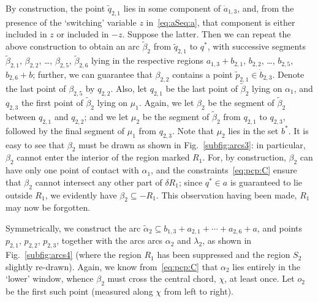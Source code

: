\documentclass{article}
\newcommand{\intermediate}[1]{\dot{#1}}
\begin{document}
By construction, the point $\tilde{q}_{2,1}$ lies in some component of
$\intermediate{a}_{1,3}$, and, from the presence of the `switching'
variable $z$ in~\eqref{eq:aSeq:a}, that component is either included
in $z$ or included in $-z$. Suppose the latter.  Then we can repeat
the above construction to obtain an arc $\tilde{\beta}_2$ from
$\tilde{q}_{2,1}$ to $q^*$, with successive segments
$\tilde{\beta}_{2,1}$, $\beta_{2,2}$, \ldots, $\beta_{2,5}$,
$\tilde{\beta}_{2,6}$ lying in the respective regions $a_{1,3} +
b_{2,1}$, $b_{2,2}$, \dots, $b_{2,5}$, $b_{2,6} + b$; further, we can
guarantee that $\beta_{2,2}$ contains a point $\tilde{p}_{2,1} \in
\intermediate{b}_{2,3}$.  Denote the last point of $\beta_{2,5}$ by
$q_{2,2}$. Also, let $q_{2,1}$ be the last point of $\tilde{\beta}_2$
lying on $\alpha_1$, and $q_{2,3}$ the first point of
$\tilde{\beta}_2$ lying on $\mu_1$.  Again, we let $\beta_2$ be the
segment of $\tilde{\beta}_2$ between $q_{2,1}$ and $q_{2,2}$; and we
let $\mu_2$ be the segment of $\tilde{\beta}_2$ from $q_{2,1}$ to
$q_{2,3}$, followed by the final segment of $\mu_1$ from $q_{2,3}$.
Note that $\mu_2$ lies in the set $b^*$. It is easy to see that $\beta_2$
must be drawn as shown in Fig.~\ref{subfig:arcs3}: in particular,
$\beta_2$ cannot enter the interior of the region marked $R_1$. For,
by construction, $\beta_2$ can have only one point of contact with
$\alpha_1$, and the constraints~\eqref{eq:pcp:C} ensure that $\beta_2$
cannot intersect any other part of $\delta R_1$; since $q^* \in a$ is
guaranteed to lie outside $R_1$, we evidently have $\beta_2
\subseteq -R_1$. This observation having been made, $R_1$ may now be
forgotten.

Symmetrically, we construct the arc $\tilde{\alpha}_2 \subseteq
b_{1,3} + a_{2,1} + \cdots + a_{2,6} + a$, and points $p_{2,1}$,
$p_{2,2}$, $p_{2,3}$, together with the arcs arcs $\alpha_2$ and
$\lambda_2$, as shown in Fig.~\ref{subfig:arcs4} (where the region
$R_1$ has been suppressed and the region $S_2$ slightly
re-drawn). Again, we know from~\eqref{eq:pcp:C} that $\alpha_2$
lies entirely in the `lower' window, whence $\beta_2$ must cross the
central chord, $\chi$, at least once. Let $o_2$ be the first such
point (measured along $\chi$ from left to right).
\end{document}
